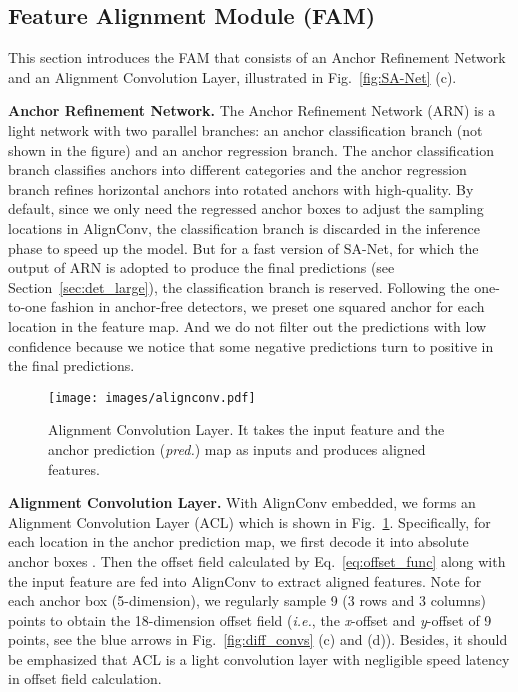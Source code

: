 \documentclass[10pt,journal,final]{IEEEtran}
\def\ie{{\em i.e.}}
\begin{document}
\subsection{Feature Alignment Module (FAM)}
\label{sec:fam}
This section introduces the FAM that consists of an Anchor Refinement Network and an Alignment Convolution Layer, illustrated in Fig.~\ref{fig:SA-Net} (c).

{\bf Anchor Refinement Network.} The Anchor Refinement Network (ARN) is a light network with two parallel branches: an anchor classification branch (not shown in the figure) and an anchor regression branch. The anchor classification branch classifies anchors into different categories and the anchor regression branch refines horizontal anchors into rotated anchors with high-quality. 
By default, since we only need the regressed anchor boxes to adjust the sampling locations in AlignConv, the classification branch is discarded in the inference phase to speed up the model. But for a fast version of SA-Net, for which the output of ARN is adopted to produce the final predictions (see Section~\ref{sec:det_large}), the classification branch is reserved. Following the one-to-one fashion in anchor-free detectors, we preset one squared anchor for each location in the feature map. And we do not filter out the predictions with low confidence because we notice that some negative predictions turn to positive in the final predictions. 

\begin{figure}[!t]
  \centering
  \texttt{[image: images/alignconv.pdf]}
  \vspace{-3mm}
  \caption{Alignment Convolution Layer. It takes the input feature and the anchor prediction (\emph{pred.}) map as inputs and produces aligned features. }
\label{fig:alignconv}
   \vspace{-3mm}
\end{figure}

{\bf Alignment Convolution Layer.} With AlignConv embedded, we forms an Alignment Convolution Layer (ACL) which is shown in Fig.~\ref{fig:alignconv}. Specifically, for each location in the  anchor prediction map, we first decode it into absolute anchor boxes . Then the offset field calculated by Eq.~\eqref{eq:offset_func} along with the input feature are fed into AlignConv to extract aligned features. 
Note for each anchor box (5-dimension), we regularly sample 9 (3 rows and 3 columns) points to obtain the 18-dimension offset field (\ie, the \emph{x}-offset and \emph{y}-offset of 9 points, see the blue arrows in Fig.~\ref{fig:diff_convs} (c) and (d)). Besides, it should be emphasized that ACL is a light convolution layer with negligible speed latency in offset field calculation.
\end{document}
